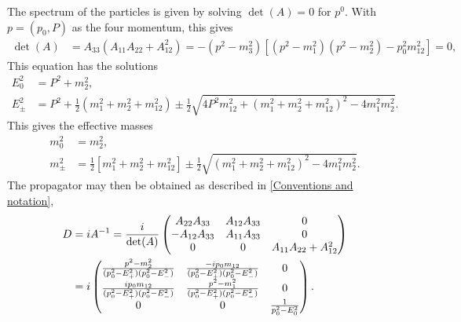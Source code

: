 The spectrum of the particles is given by solving $\det(A) = 0$ for $p^0$. With $p = (p_0, P)$ as the four momentum, this gives
\begin{align*}
    \det(A) & = A_{33} \left(A_{11} A_{22} + A_{12}^2\right)
    = - \left(p^2 - m^2_3\right)
    \left[
        \left(p^2 - m^2_1\right)
        \left(p^2 - m^2_2\right)
        - p_0^2 m_{12}^2
    \right] = 0,
\end{align*}
This equation has the solutions
\begin{align}
    E_0^2 &= P^2 + m_2^2, \\
    E_\pm^2
    & = P^2 +
    \frac{1}{2}
    \left(
        m_1^2 + m_2^2 + m_{12}^2 
    \right)
    \pm 
    \frac{1}{2}
    \sqrt{
        4P^2m_{12}^2 
        +
        \left(
            m_1^2 + m_2^2 + m_{12}^2
        \right)^2
        - 4 m_1^2 m_2^2
    }.
\end{align}
This gives the effective masses
\begin{align}
    m_0^2 &= m_2^2, \\
    m_\pm^2
    & =  \frac{1}{2}
    \left[
        m_1^2 + m_2^2 + m_{12}^2 
    \right]
    \pm \frac{1}{2}
    \sqrt{
        \left(
            m_1^2 + m_2^2 + m_{12}^2
        \right)^2
        - 4 m_1^2 m_2^2
    }.
\end{align}
The propagator may then be obtained as described in \autoref{Conventions and notation},
\begin{align}
    \notag
    D & = i A^{-1} = \frac{i}{\det(A)}
    \begin{pmatrix}
        A_{22} A_{33}   & A_{12}A_{33}  & 0 \\
        -A_{12}A_{33}   & A_{11}A_{33}  & 0 \\
        0               & 0             & A_{11}A_{22} + A_{12}^2
    \end{pmatrix} \\
    & = i
    \begin{pmatrix}
        \frac{
            p^2 - m_2^2
        }
        {
            (p_0^2 - E_+^2)(p_0^2 - E_-^2)
        } 
        & \frac{
            - ip_0m_{12}
        }
        {
            (p_0^2 - E_+^2)(p_0^2 - E_-^2)
        } & 0 \\
        \frac{
            ip_0m_{12}
        }
        {
            (p_0^2 - E_+^2)(p_0^2 - E_-^2)
        }
        & \frac{
            p^2 - m_1^2
        }
        {
            (p_0^2 - E_+^2)(p_0^2 - E_-^2)
        } & 0 \\
        0 & 0 & 
        \frac{1}{p_0^2 - E_0^2}
    \end{pmatrix}.
\end{align}

